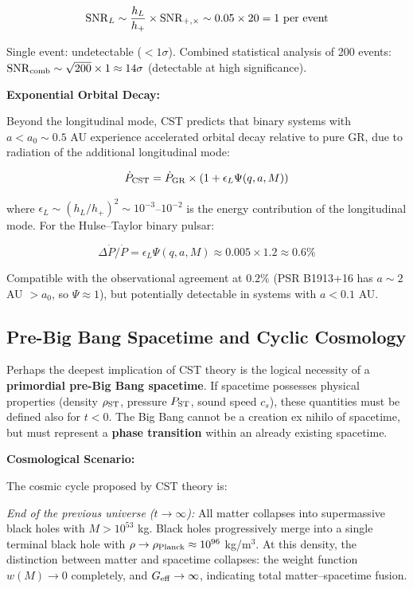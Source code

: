 \documentclass[11pt,a4paper]{article}
\begin{document}
\[{\rm SNR}_L \sim \frac{h_L}{h_+} \times {\rm SNR}_{+,\times} \sim 0.05 \times 20 = 1~{\rm per~event}\]

Single event: undetectable (\(< 1\sigma\)). Combined statistical
analysis of 200 events:
\({\rm SNR}_{\rm comb} \sim \sqrt{200} \times 1 \approx 14\sigma\)
(detectable at high significance).

\textbf{Exponential Orbital Decay:}

Beyond the longitudinal mode, CST predicts that binary systems with
\(a < a_0 \sim 0.5\) AU experience accelerated orbital decay relative to
pure GR, due to radiation of the additional longitudinal mode:

\[\dot{P}_{\rm CST} = \dot{P}_{\rm GR} \times \left(1 + \epsilon_L \Psi(q,a,M)\right)\]

where \(\epsilon_L \sim (h_L/h_+)^2 \sim 10^{-3}\)--\(10^{-2}\) is the
energy contribution of the longitudinal mode. For the Hulse--Taylor
binary pulsar:

\[\Delta\dot{P}/\dot{P} = \epsilon_L \Psi(q,a,M) \approx 0.005 \times 1.2 \approx 0.6\%\]

Compatible with the observational agreement at \(0.2\%\) (PSR B1913+16
has \(a \sim 2\) AU \(> a_0\), so \(\Psi \approx 1\)), but potentially
detectable in systems with \(a < 0.1\) AU.

\hypertarget{pre-big-bang-spacetime-and-cyclic-cosmology}{%
\subsection{Pre-Big Bang Spacetime and Cyclic
Cosmology}\label{pre-big-bang-spacetime-and-cyclic-cosmology}}

Perhaps the deepest implication of CST theory is the logical necessity
of a \textbf{primordial pre-Big Bang spacetime}. If spacetime possesses
physical properties (density \(\rho_{\rm ST}\), pressure \(P_{\rm ST}\),
sound speed \(c_s\)), these quantities must be defined also for
\(t < 0\). The Big Bang cannot be a creation ex nihilo of spacetime, but
must represent a \textbf{phase transition} within an already existing
spacetime.

\textbf{Cosmological Scenario:}

The cosmic cycle proposed by CST theory is:

\emph{End of the previous universe (\(t \to \infty\)):} All matter
collapses into supermassive black holes with \(M > 10^{53}\) kg. Black
holes progressively merge into a single terminal black hole with
\(\rho \to \rho_{\rm Planck} \approx 10^{96}\) kg/m$^{3}$. At this density,
the distinction between matter and spacetime collapses: the weight
function \(w(M) \to 0\) completely, and \(G_{\rm eff} \to \infty\),
indicating total matter--spacetime fusion.
\end{document}
